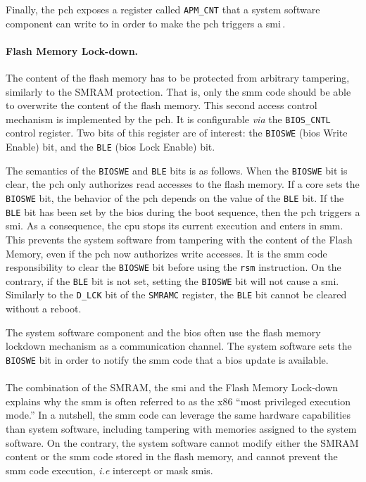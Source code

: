 Finally, the \ac{pch} exposes a register called \texttt{APM\_CNT} that a system
software component can write to in order to make the \ac{pch} triggers a
\ac{smi}\,\cite{intel2012pch}.

\paragraph{Flash Memory Lock-down.}
%
The content of the flash memory has to be protected from arbitrary tampering,
similarly to the SMRAM protection.
%
That is, only the \ac{smm} code should be able to overwrite the content of the
flash memory.
%
This second access control mechanism is implemented by the \ac{pch}.
%
It is configurable \emph{via} the \texttt{BIOS\_CNTL} control register.
%
Two bits of this register are of interest: the \texttt{BIOSWE} (\ac{bios} Write
Enable) bit, and the \texttt{BLE} (\ac{bios} Lock Enable) bit.

The semantics of the \texttt{BIOSWE} and \texttt{BLE} bits is as follows.
%
When the \texttt{BIOSWE} bit is clear, the \ac{pch} only authorizes read
accesses to the flash memory.
%
If a core sets the \texttt{BIOSWE} bit, the behavior of the \ac{pch}
depends on the value of the \texttt{BLE} bit.
%
If the \texttt{BLE} bit has been set by the \ac{bios} during the boot sequence,
then the \ac{pch} triggers a \ac{smi}.
%
As a consequence, the \ac{cpu} stops its current execution and enters in
\ac{smm}.
%
This prevents the system software from tampering with the content of the Flash
Memory, even if the \ac{pch} now authorizes write accesses.
%
It is the \ac{smm} code responsibility to clear the \texttt{BIOSWE} bit before
using the \texttt{rsm} instruction.
%
On the contrary, if the \texttt{BLE} bit is not set, setting the \texttt{BIOSWE}
bit will not cause a \ac{smi}.
%
Similarly to the \texttt{D\_LCK} bit of the \texttt{SMRAMC} register, the
\texttt{BLE} bit cannot be cleared without a reboot.


The system software component and the \ac{bios} often use the flash memory lockdown mechanism as a communication channel.
%
The system software sets the \texttt{BIOSWE} bit in order to notify the \ac{smm}
code that a \ac{bios} update is available.

\paragraph{}
%
The combination of the SMRAM, the \ac{smi} and the Flash Memory Lock-down
explains why the \ac{smm} is often referred to as the x86 ``most privileged execution
mode.''
%
In a nutshell, the \ac{smm} code can leverage the same hardware capabilities
than system software, including tampering with memories assigned to the system
software.
%
On the contrary, the system software cannot modify either the SMRAM content or
the \ac{smm} code stored in the flash memory, and cannot prevent the \ac{smm}
code execution, \emph{i.e} intercept or mask \acp{smi}.



